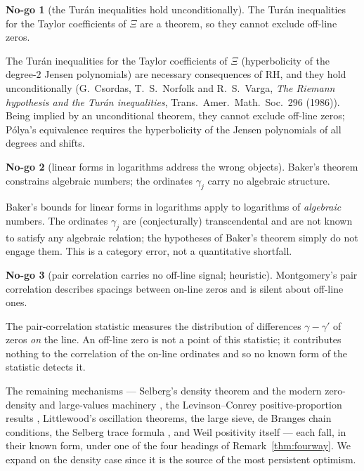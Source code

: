 \documentclass[11pt]{amsart}
\theoremstyle{definition}
\theoremstyle{remark}
\theoremstyle{definition}
\newtheorem{nogo}{No-go}[section]
\begin{document}
\begin{nogo}[the Tur\'an inequalities hold unconditionally]\label{ng:turan}
The Tur\'an inequalities for the Taylor coefficients of $\Xi$ are a theorem, so they cannot exclude off-line
zeros.
\end{nogo}
\noindent The Tur\'an inequalities for the Taylor coefficients of $\Xi$ (hyperbolicity of the degree-$2$
Jensen polynomials) are necessary consequences of RH, and they hold unconditionally (G.~Csordas,
T.~S.~Norfolk and R.~S.~Varga, \emph{The Riemann hypothesis and the Tur\'an inequalities}, Trans.\ Amer.\
Math.\ Soc.\ 296 (1986)). Being implied by an unconditional theorem, they cannot exclude off-line zeros;
P\'olya's equivalence requires the hyperbolicity of the Jensen polynomials of all degrees and shifts.

\begin{nogo}[linear forms in logarithms address the wrong objects]\label{ng:baker}
Baker's theorem constrains algebraic numbers; the ordinates $\gamma_j$ carry no algebraic structure.
\end{nogo}
\noindent Baker's bounds for linear forms in logarithms \cite{IwaniecKowalski} apply to logarithms of
\emph{algebraic} numbers. The ordinates $\gamma_j$ are (conjecturally) transcendental and are not known to
satisfy any algebraic relation; the hypotheses of Baker's theorem simply do not engage them. This is a
category error, not a quantitative shortfall.

\begin{nogo}[pair correlation carries no off-line signal; heuristic]\label{ng:paircorr}
Montgomery's pair correlation describes spacings between on-line zeros and is silent about off-line ones.
\end{nogo}
\noindent The pair-correlation statistic \cite{Montgomery,Odlyzko,RudnickSarnak} measures the distribution
of differences $\gamma-\gamma'$ of zeros \emph{on} the line. An off-line zero is not a point of this
statistic; it contributes nothing to the correlation of the on-line ordinates and so no known form of the
statistic detects it.

The remaining mechanisms --- Selberg's density theorem and the modern zero-density and large-values
machinery \cite{Ingham,Huxley,Wooley,TTY}, the Levinson--Conrey positive-proportion results
\cite{Levinson,Conrey1989}, Littlewood's oscillation theorems, the large sieve, de Branges chain
conditions, the Selberg trace formula \cite{IwaniecSpectral}, and Weil positivity itself --- each fall, in their known form, under
one of the four headings of Remark~\ref{thm:fourway}. We expand on the density case since it is the source of the most persistent
optimism.
\end{document}
